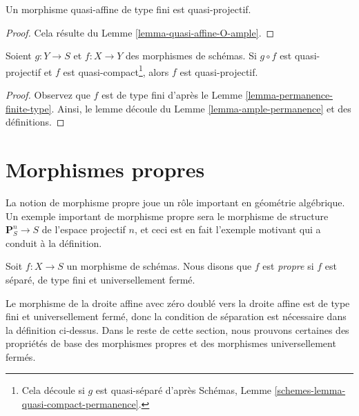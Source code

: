 \begin{lemma}
\label{lemma-quasi-affine-finite-type-quasi-projective}
\begin{reference}
\cite[II, Proposition 5.3.4 (i)]{EGA}
\end{reference}
Un morphisme quasi-affine de type fini est quasi-projectif.
\end{lemma}

\begin{proof}
Cela résulte du Lemme \ref{lemma-quasi-affine-O-ample}.
\end{proof}

\begin{lemma}
\label{lemma-quasi-projective-permanence}
Soient $g : Y \to S$ et $f : X \to Y$ des morphismes de schémas. Si $g \circ f$
est quasi-projectif et $f$ est
quasi-compact\footnote{Cela découle si $g$ est quasi-séparé
d'après Schémas, Lemme \ref{schemes-lemma-quasi-compact-permanence}.}, alors $f$
est quasi-projectif.
\end{lemma}

\begin{proof}
Observez que $f$ est de
type fini d'après le Lemme \ref{lemma-permanence-finite-type}.
Ainsi, le lemme découle du Lemme \ref{lemma-ample-permanence} et des
définitions.
\end{proof}





\section{Morphismes propres}
\label{section-proper}

\noindent
La notion de morphisme propre joue un rôle important en géométrie algébrique.
Un exemple important de morphisme propre sera le morphisme
de structure $\mathbf{P}^n_S \to S$ de l'espace projectif $n$, et
ceci est en fait l'exemple motivant qui a conduit à la définition.

\begin{definition}
\label{definition-proper}
Soit $f : X \to S$ un morphisme de schémas. Nous disons que $f$
est {\it propre} si $f$ est séparé, de type fini
et universellement fermé.
\end{definition}

\noindent
Le morphisme de la droite affine avec zéro doublé vers la droite affine est de type
fini et universellement fermé, donc la condition de séparation est nécessaire
dans la définition ci-dessus. Dans le
reste de cette section, nous prouvons certaines des propriétés de base des
morphismes propres et des morphismes universellement fermés.

